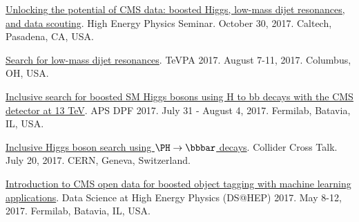 \documentclass{res}
\begin{document}
\begin{resume}
  \href{https://indico.hep.caltech.edu/indico/conferenceDisplay.py?confId=149}{Unlocking the potential of CMS data: boosted Higgs, low-mass dijet resonances, and data scouting}. High Energy Physics Seminar. October 30, 2017. Caltech, Pasadena, CA, USA.

  \href{https://indico.cern.ch/event/615891/contributions/2666361/}{Search for low-mass dijet resonances}. TeVPA 2017. August 7-11, 2017. Columbus, OH, USA.

  \href{https://indico.fnal.gov/contributionDisplay.py?sessionId=14&contribId=38&confId=11999}{Inclusive search for boosted SM Higgs bosons using H to bb decays with the CMS detector at 13 TeV}. APS DPF 2017. July 31 - August 4, 2017. Fermilab, Batavia, IL, USA.

  \href{https://indico.cern.ch/event/649575/}{Inclusive Higgs boson search using $\PH\to\bbbar$ decays}. Collider Cross Talk. July 20, 2017. CERN, Geneva, Switzerland.

  \href{https://indico.fnal.gov/contributionDisplay.py?sessionId=6&contribId=54&confId=13497}{Introduction to CMS open data for boosted object tagging with machine learning applications}. Data Science at High Energy Physics (DS@HEP) 2017. May 8-12, 2017. Fermilab, Batavia, IL, USA.

\end{resume}
\end{document}
